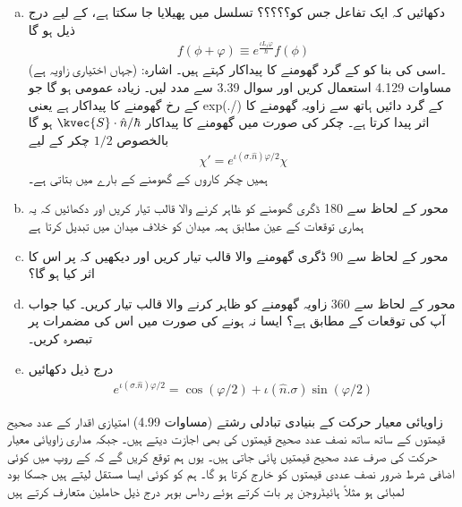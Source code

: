 \begin{enumerate}[a.]
\item  دکھائیں کہ ایک تفاعل  جس کو؟؟؟؟؟ تسلسل میں پھیلایا جا سکتا ہے، کے لیے درج ذیل ہو گا 
\begin{align*}
    f(\phi+\varphi)\equiv e^{\frac{\iota L_z\varphi}{\hslash}}f(\phi)
\end{align*} 
(جہاں  اختیاری زاویہ ہے) ۔اسی کی بنا  کو  کے گرد گھومنے کا پیداکار کہتے ہیں۔ اشارہ: مساوات 4.129 استعمال کریں اور سوال 3.39 سے مدد لیں۔ زیادہ عمومی  ہو گا جو  کے رخ گھومنے کا پیداکار ہے یعنی   exp(\iota {}.\varphi/\hslash)  کے گرد دائیں ہاتھ سے     زاویہ { \varphi  } گھومنے کا اثر پیدا کرتا ہے۔ چکر کی صورت میں گھومنے کا پیداکار  \( \kvec{S}\cdot\hat{n}/\hbar \) ہو گا بالخصوص  \(1/2\)  چکر کے لیے
\begin{align}
    \chi'=e^{\iota(\sigma.\hat{n})\varphi/2}\chi
\end{align} ہمیں چکر کاروں کے گھومنے کے بارے میں بتاتی ہے۔
\item محور  کے لحاظ سے 180 ڈگری گھومنے کو ظاہر کرنے والا  قالب تیار کریں اور دکھائیں کہ یہ ہماری توقعات کے عین مطابق ہمہ میدان  کو خلاف میدان  میں تبدیل کرتا ہے 
\item محور  کے لحاظ سے 90 ڈگری گھومنے والا قالب تیار کریں اور دیکھیں کہ  پر اس کا اثر کیا ہو گا؟ 
\item محور  کے لحاظ سے 360 زاویہ گھومنے کو ظاہر کرنے والا قالب تیار کریں۔ کیا جواب آپ کی توقعات کے مطابق ہے؟ ایسا نہ ہونے کی صورت میں اس کی مضمرات پر تبصرہ کریں۔
\item درج ذیل دکھائیں 
\begin{align} e^{\iota(\sigma.\hat{n})\varphi/2}=\cos{(\varphi/2)}+\iota(\hat{n}.\sigma)\sin{(\varphi/2)}
\end{align}
\end{enumerate}
زاویائی معیار حرکت کے بنیادی تبادلی رشتے (مساوات 4.99) امتیازی اقدار کے عدد صحیح قیمتوں کے ساتھ ساتھ نصف عدد صحیح قیمتوں کی بھی اجازت دیتے ہیں۔ جبکہ مداری زاویائی معیار حرکت کی صرف عدد صحیح قیمتیں پائی جاتی ہیں۔ یوں ہم توقع کریں گے کہ  کے روپ میں کوئی اضافی شرط ضرور نصف عددی قیمتوں کو خارج کرتا ہو گا۔ ہم  کو کوئی ایسا مستقل لیتے ہیں جسکا بود لمبائی ہو مثلاً ہائیڈروجن پر بات کرتے ہوئے رداس بوہر درج ذیل حاملین متعارف کرتے ہیں 
